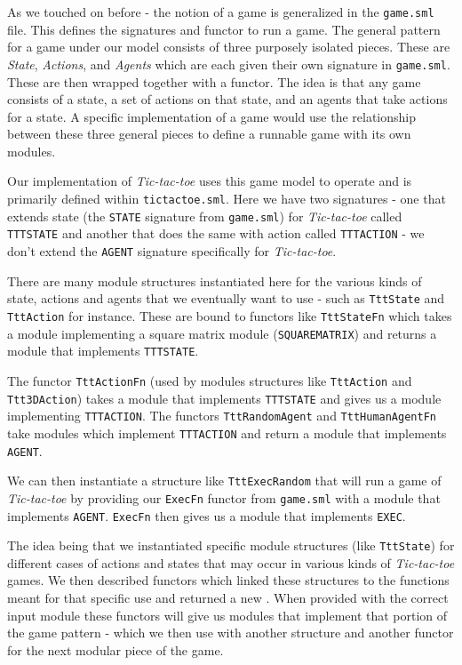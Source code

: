 \documentclass[9pt,letterpaper]{extarticle}
\begin{document}
  As we touched on before - the notion of a game is generalized in the
  \texttt{game.sml} file. This defines the signatures and functor to run a game.
  The general pattern for a game under our model consists of three purposely
  isolated pieces.
  These are \textit{State}, \textit{Actions}, and \textit{Agents} which are
  each given their own signature in \texttt{game.sml}.
  These are then wrapped together with a functor. The idea is that any game
  consists of a state, a set of actions on that state, and an agents that take
  actions for a state. A specific implementation of a game would use the
  relationship between these three general pieces to define a runnable game with
  its own modules.

  Our implementation of \textit{Tic-tac-toe} uses this game model to operate and
  is primarily defined within \texttt{tictactoe.sml}.
  Here we have two signatures - one that extends state (the \texttt{STATE}
  signature from \texttt{game.sml}) for \textit{Tic-tac-toe}
  called \texttt{TTTSTATE} and another that does the same with action called
  \texttt{TTTACTION} - we don't extend the \texttt{AGENT} signature specifically
  for \textit{Tic-tac-toe}.

  There are many module structures instantiated here for the various kinds of
  state, actions and agents that we eventually want to use -
  such as \texttt{TttState} and \texttt{TttAction} for instance.
  These are bound to functors like \texttt{TttStateFn} which takes
  a module implementing a square matrix module (\texttt{SQUAREMATRIX})
  and returns a module that implements \texttt{TTTSTATE}.
  
  The functor \texttt{TttActionFn} (used by modules structures like
  \texttt{TttAction} and \texttt{Ttt3DAction}) takes a module that implements
  \texttt{TTTSTATE} and gives us a module implementing \texttt{TTTACTION}.
  The functors \texttt{TttRandomAgent} and \texttt{TttHumanAgentFn} take
  modules which implement \texttt{TTTACTION} and return a module that implements
  \texttt{AGENT}.

  We can then instantiate a structure like \texttt{TttExecRandom} that will run
  a game of \textit{Tic-tac-toe} by providing our \texttt{ExecFn} functor from
  \texttt{game.sml} with a module that implements \texttt{AGENT}.
  \texttt{ExecFn} then gives us a module that implements \texttt{EXEC}.
  
  The idea being that we instantiated specific module structures
  (like \texttt{TttState}) for different cases of actions and states that may
  occur in various kinds of \textit{Tic-tac-toe} games.
  We then described functors which linked these structures to the functions
  meant for that specific use and returned a new .
  When provided with the correct input module these functors will give us
  modules that implement that portion of the game pattern - which we then use
  with another structure and another functor for the next modular piece of the
  game.
\end{document}
